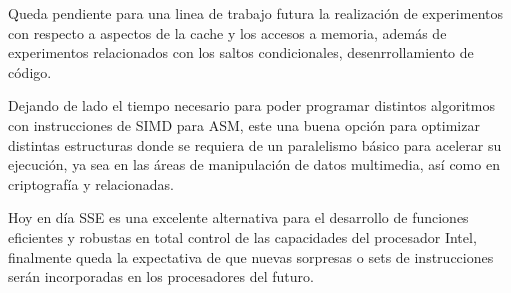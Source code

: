 \documentclass[a4paper]{article}
\begin{document}
Queda pendiente para una linea de trabajo futura la realización de experimentos con respecto a aspectos de la cache y los accesos a memoria, además de experimentos relacionados con los saltos condicionales, desenrrollamiento de código.

Dejando de lado el tiempo necesario para poder programar distintos algoritmos con instrucciones de SIMD para ASM, este una buena opción para optimizar distintas estructuras donde se requiera de un paralelismo básico para acelerar su ejecución, ya sea en las áreas de manipulación de datos multimedia, así como en criptografía y relacionadas. 

Hoy en día SSE es una excelente alternativa para el desarrollo de funciones eficientes y robustas en total control de las capacidades del procesador Intel, finalmente queda la expectativa de que nuevas sorpresas o sets de instrucciones serán incorporadas en los procesadores del futuro. 


\end{document}
